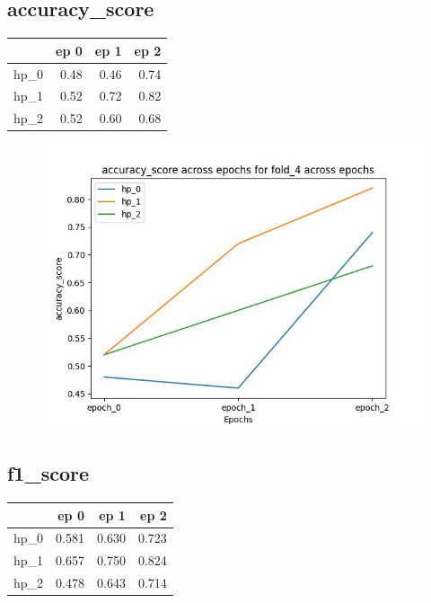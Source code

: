\documentclass{article}
\begin{document}
\subsection{accuracy\_score}
\begin{tabular}{lrrr}
\toprule
{} &  ep 0 &  ep 1 &  ep 2 \\
\midrule
hp\_0 &  0.48 &  0.46 &  0.74 \\
hp\_1 &  0.52 &  0.72 &  0.82 \\
hp\_2 &  0.52 &  0.60 &  0.68 \\
\bottomrule
\end{tabular}

\begin{figure}[H]
\includegraphics[scale = 0.75]{fold_4/accuracy_score}
\end{figure}
\subsection{f1\_score}
\begin{tabular}{lrrr}
\toprule
{} &   ep 0 &   ep 1 &   ep 2 \\
\midrule
hp\_0 &  0.581 &  0.630 &  0.723 \\
hp\_1 &  0.657 &  0.750 &  0.824 \\
hp\_2 &  0.478 &  0.643 &  0.714 \\
\bottomrule
\end{tabular}
\end{document}
